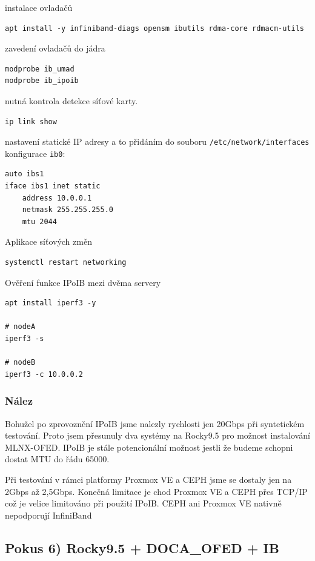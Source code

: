 instalace ovladačů
\begin{verbatim}
apt install -y infiniband-diags opensm ibutils rdma-core rdmacm-utils
\end{verbatim}

zavedení ovladačů do jádra
\begin{verbatim}
modprobe ib_umad
modprobe ib_ipoib
\end{verbatim}

nutná kontrola detekce síťové karty.
\begin{verbatim}
ip link show 
\end{verbatim}

nastavení statické IP adresy a to přidáním do souboru \texttt{/etc/network/interfaces} konfigurace \texttt{ib0}:
\begin{verbatim}
auto ibs1
iface ibs1 inet static
    address 10.0.0.1
    netmask 255.255.255.0
    mtu 2044
\end{verbatim}

Aplikace síťových změn
\begin{verbatim}
systemctl restart networking
\end{verbatim}


Ověření funkce IPoIB mezi dvěma servery
\begin{verbatim}
apt install iperf3 -y

# nodeA
iperf3 -s

# nodeB
iperf3 -c 10.0.0.2
\end{verbatim}

\subsubsection{Nález}
Bohužel po zprovoznění IPoIB jsme nalezly rychlosti jen 20Gbps při syntetickém testování. Proto jsem přesunuly dva systémy na Rocky9.5 pro možnost instalování MLNX-OFED\cite{OFED}. IPoIB je stále potencionální možnost jestli že budeme schopni dostat MTU do řádu 65000.

Při testování v rámci platformy Proxmox VE a CEPH jsme se dostaly jen na 2Gbps až 2,5Gbps. Konečná limitace je chod Proxmox VE a CEPH přes TCP/IP což je velice limitováno při použití IPoIB. CEPH ani Proxmox VE nativně nepodporují InfiniBand

\newpage
\subsection{Pokus 6) Rocky9.5 + DOCA\_OFED + IB}
\label{pokus6}
\povedeno

